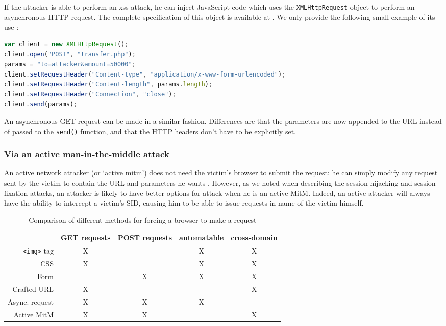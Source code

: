 If the attacker is able to perform an \gls{xss} attack, he can inject JavaScript code which uses the \texttt{XMLHttpRequest} object to perform an asynchronous HTTP request. The complete specification of this object is available at \cite{Kesteren:09:X}. We only provide the following small example of its use \cite{Binny2010}:
\begin{lstlisting}[language=JavaScript,breaklines=true]
var client = new XMLHttpRequest();
client.open("POST", "transfer.php");
params = "to=attacker&amount=50000";
client.setRequestHeader("Content-type", "application/x-www-form-urlencoded");
client.setRequestHeader("Content-length", params.length);
client.setRequestHeader("Connection", "close");
client.send(params);
\end{lstlisting}
An asynchronous GET request can be made in a similar fashion. Differences are that the parameters are now appended to the URL instead of passed to the \texttt{send()} function, and that the HTTP headers don't have to be explicitly set.

\subsubsection{Via an active man-in-the-middle attack}

An active network attacker (or `active \gls{mitm}') does not need the victim's browser to submit the request: he can simply modify any request sent by the victim to contain the URL and parameters he wants \cite{Barth2008}. However, as we noted when describing the session hijacking and session fixation attacks, an attacker is likely to have better options for attack when he is an active MitM. Indeed, an active attacker will always have the ability to intercept a victim's SID, causing him to be able to issue requests in name of the victim himself. 

\begin{table}[htb]
	\centering
	\begin{tabular}{r|cccc}
		& GET requests & POST requests & automatable & cross-domain\\
		\hline
		\texttt{<img>} tag & X & & X & X\\
		CSS & X & & X & X\\
		Form &  & X & X & X\\
		Crafted URL & X & & & X\\
		Async. request & X & X & X &\\
		Active MitM & X & X & & X
	\end{tabular}
	\caption{Comparison of different methods for forcing a browser to make a request}
	\label{tab:forcing-request}
\end{table}

